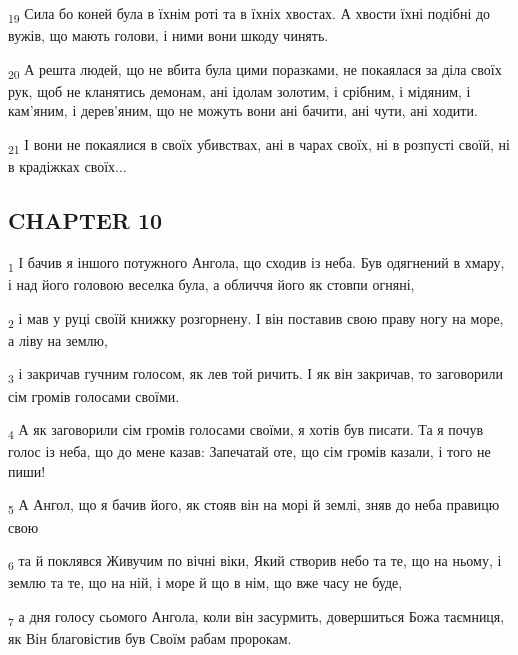\begin{tcolorbox}
\textsubscript{19} Сила бо коней була в їхнім роті та в їхніх хвостах. А хвости їхні подібні до вужів, що мають голови, і ними вони шкоду чинять.
\end{tcolorbox}
\begin{tcolorbox}
\textsubscript{20} А решта людей, що не вбита була цими поразками, не покаялася за діла своїх рук, щоб не кланятись демонам, ані ідолам золотим, і срібним, і мідяним, і кам'яним, і дерев'яним, що не можуть вони ані бачити, ані чути, ані ходити.
\end{tcolorbox}
\begin{tcolorbox}
\textsubscript{21} І вони не покаялися в своїх убивствах, ані в чарах своїх, ні в розпусті своїй, ні в крадіжках своїх...
\end{tcolorbox}
\subsection{CHAPTER 10}
\begin{tcolorbox}
\textsubscript{1} І бачив я іншого потужного Ангола, що сходив із неба. Був одягнений в хмару, і над його головою веселка була, а обличчя його як стовпи огняні,
\end{tcolorbox}
\begin{tcolorbox}
\textsubscript{2} і мав у руці своїй книжку розгорнену. І він поставив свою праву ногу на море, а ліву на землю,
\end{tcolorbox}
\begin{tcolorbox}
\textsubscript{3} і закричав гучним голосом, як лев той ричить. І як він закричав, то заговорили сім громів голосами своїми.
\end{tcolorbox}
\begin{tcolorbox}
\textsubscript{4} А як заговорили сім громів голосами своїми, я хотів був писати. Та я почув голос із неба, що до мене казав: Запечатай оте, що сім громів казали, і того не пиши!
\end{tcolorbox}
\begin{tcolorbox}
\textsubscript{5} А Ангол, що я бачив його, як стояв він на морі й землі, зняв до неба правицю свою
\end{tcolorbox}
\begin{tcolorbox}
\textsubscript{6} та й поклявся Живучим по вічні віки, Який створив небо та те, що на ньому, і землю та те, що на ній, і море й що в нім, що вже часу не буде,
\end{tcolorbox}
\begin{tcolorbox}
\textsubscript{7} а дня голосу сьомого Ангола, коли він засурмить, довершиться Божа таємниця, як Він благовістив був Своїм рабам пророкам.
\end{tcolorbox}
